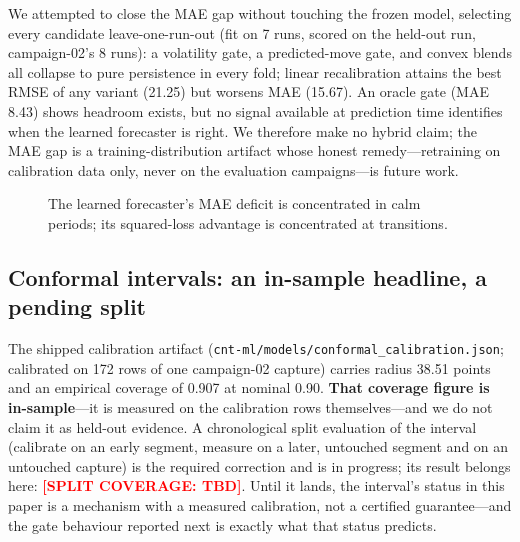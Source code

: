 \documentclass[conference]{IEEEtran}
\begin{document}
We attempted to close the MAE gap without touching the frozen model,
selecting every candidate leave-one-run-out (fit on 7 runs, scored on
the held-out run, campaign-02's 8 runs): a volatility gate, a
predicted-move gate, and convex blends all collapse to pure
persistence in every fold; linear recalibration attains the best RMSE
of any variant (21.25) but worsens MAE (15.67). An oracle gate
(MAE 8.43) shows headroom exists, but no signal available at
prediction time identifies when the learned forecaster is right. We
therefore make no hybrid claim; the MAE gap is a training-distribution
artifact whose honest remedy---retraining on calibration data only,
never on the evaluation campaigns---is future work.

\begin{figure}[t]
\centering
{}
\caption{The learned forecaster's MAE deficit is concentrated in
calm periods; its squared-loss advantage is concentrated at
transitions.}
\label{fig:regime}
\end{figure}

\subsection{Conformal intervals: an in-sample headline, a pending split}
\label{sec:conformal}
The shipped calibration artifact
(\texttt{cnt-ml/models/conformal\_calibration.json}; calibrated on
172 rows of one campaign-02 capture) carries radius 38.51 points and
an empirical coverage of 0.907 at nominal 0.90. \textbf{That coverage
figure is in-sample}---it is measured on the calibration rows
themselves---and we do not claim it as held-out evidence. A
chronological split evaluation of the interval (calibrate on an early
segment, measure on a later, untouched segment and on an untouched
capture) is the required correction and is in progress; its result
belongs here: \textcolor{red}{\textbf{[SPLIT COVERAGE: TBD]}}.
Until it lands, the interval's status in this paper is a mechanism
with a measured calibration, not a certified guarantee---and the
gate behaviour reported next is exactly what that status predicts.
\end{document}
